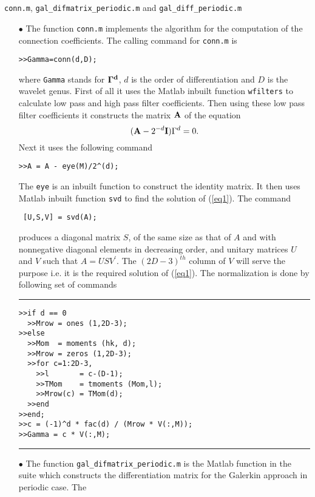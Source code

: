 \documentclass[acmtoms]{acmtrans2m}
\begin{document}
\section{} {\tt conn.m}, \verb#gal_difmatrix_periodic.m# and \verb#gal_diff_periodic.m#
\begin{itemize}
\item[$\bullet$]
The function {\tt conn.m} implements the algorithm for the computation of the connection coefficients. The calling command for {\tt conn.m} is
\begin{alltt}
>>Gamma = conn (d, D);
\end{alltt}
where \verb#Gamma# stands for ${\bf \Gamma^d}$, $d$ is the order of differentiation and $D$ is the
wavelet genus. First of all it uses the Matlab inbuilt function
{\tt wfilters} to calculate low pass and high pass filter
coefficients. Then using these low pass filter coefficients it
constructs the matrix ${\bf A}$ of the equation 
\begin{equation}\label{eq1}
({\bf A}-2^{-d}{\bf I})\Gamma^d=0. 
\end{equation}
Next it
uses the following command
\begin{verbatim}
>>A = A - eye(M)/2^(d);
\end{verbatim}
The {\tt eye} is an inbuilt function to construct the identity matrix. It then uses Matlab inbuilt function {\tt svd} to
find the solution of (\ref{eq1}). The command
\begin{verbatim}
 [U,S,V] = svd(A);
\end{verbatim}
produces a diagonal matrix $S$, of the same size as that of $A$ and
with nonnegative diagonal elements in decreasing order, and unitary
matrices $U$ and $V$ such that $A = USV^{'}$. The $(2D-3)^{th}$
column of $V$ will serve the purpose i.e. it is the required
solution of (\ref{eq1}). The normalization is done by
following set of commands
\\\hrule
\begin{verbatim}
>>if d == 0
  >>Mrow = ones (1,2D-3);
>>else
  >>Mom  = moments (hk, d);
  >>Mrow = zeros (1,2D-3);
  >>for c=1:2D-3,
    >>l       = c-(D-1);
    >>TMom    = tmoments (Mom,l);
    >>Mrow(c) = TMom(d);
  >>end
>>end;
>>c = (-1)^d * fac(d) / (Mrow * V(:,M));
>>Gamma = c * V(:,M);
\end{verbatim}
\hrule\vspace{.5cm}
\item[$\bullet$]
The function \verb#gal_difmatrix_periodic.m# is the Matlab function in the suite which
constructs the differentiation matrix for the Galerkin approach in periodic case. The

\end{itemize}
\end{document}

